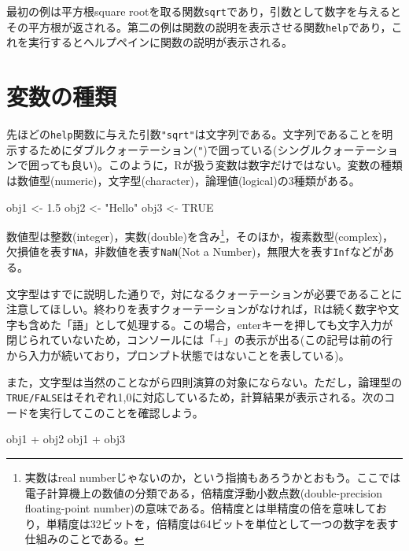 \documentclass[
  a4paper,
]{ltjsbook}
\newenvironment{Shaded}{\begin{snugshade}}{\end{snugshade}}
\newcommand{\ConstantTok}[1]{\textcolor[rgb]{0.56,0.35,0.01}{#1}}
\newcommand{\FloatTok}[1]{\textcolor[rgb]{0.68,0.00,0.00}{#1}}
\newcommand{\NormalTok}[1]{\textcolor[rgb]{0.00,0.23,0.31}{#1}}
\newcommand{\OtherTok}[1]{\textcolor[rgb]{0.00,0.23,0.31}{#1}}
\newcommand{\SpecialCharTok}[1]{\textcolor[rgb]{0.37,0.37,0.37}{#1}}
\newcommand{\StringTok}[1]{\textcolor[rgb]{0.13,0.47,0.30}{#1}}
\begin{document}
最初の例は平方根square
rootを取る関数\texttt{sqrt}であり，引数として数字を与えるとその平方根が返される。第二の例は関数の説明を表示させる関数\texttt{help}であり，これを実行するとヘルプペインに関数の説明が表示される。

\section{変数の種類}\label{ux5909ux6570ux306eux7a2eux985e}

先ほどの\texttt{help}関数に与えた引数\texttt{"sqrt"}は文字列である。文字列であることを明示するためにダブルクォーテーション(\texttt{"})で囲っている(シングルクォーテーションで囲っても良い)。このように，Rが扱う変数は数字だけではない。変数の種類は数値型(numeric)，文字型(character)，論理値(logical)の3種類がある。

\begin{Shaded}
\begin{Highlighting}[]
\NormalTok{obj1 }\OtherTok{\textless{}{-}} \FloatTok{1.5}
\NormalTok{obj2 }\OtherTok{\textless{}{-}} \StringTok{"Hello"}
\NormalTok{obj3 }\OtherTok{\textless{}{-}} \ConstantTok{TRUE}
\end{Highlighting}
\end{Shaded}

数値型は整数(integer)，実数(double)を含み\footnote{実数はreal
  numberじゃないのか，という指摘もあろうかとおもう。ここでは電子計算機上の数値の分類である，倍精度浮動小数点数(double-precision
  floating-point
  number)の意味である。倍精度とは単精度の倍を意味しており，単精度は32ビットを，倍精度は64ビットを単位として一つの数字を表す仕組みのことである。}，そのほか，複素数型(complex)，欠損値を表す\texttt{NA}，非数値を表す\texttt{NaN}(Not
a Number)，無限大を表す\texttt{Inf}などがある。

文字型はすでに説明した通りで，対になるクォーテーションが必要であることに注意してほしい。終わりを表すクォーテーションがなければ，Rは続く数字や文字も含めた「語」として処理する。この場合，enterキーを押しても文字入力が閉じられていないため，コンソールには「+」の表示が出る(この記号は前の行から入力が続いており，プロンプト状態ではないことを表している)。

また，文字型は当然のことながら四則演算の対象にならない。ただし，論理型の\texttt{TRUE/FALSE}はそれぞれ1,0に対応しているため，計算結果が表示される。次のコードを実行してこのことを確認しよう。

\begin{Shaded}
\begin{Highlighting}[]
\NormalTok{obj1 }\SpecialCharTok{+}\NormalTok{ obj2}
\NormalTok{obj1 }\SpecialCharTok{+}\NormalTok{ obj3}
\end{Highlighting}
\end{Shaded}
\end{document}
